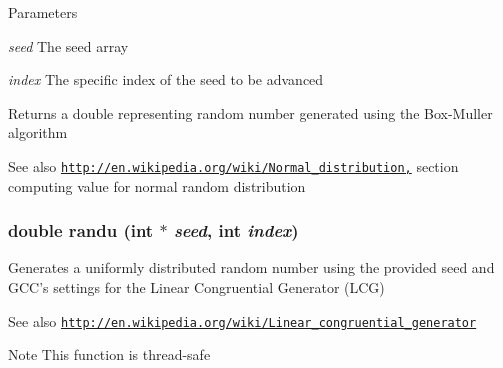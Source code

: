 \begin{DoxyParams}{Parameters}
\item[{\em seed}]The seed array \item[{\em index}]The specific index of the seed to be advanced \end{DoxyParams}
\begin{DoxyReturn}{Returns}
a double representing random number generated using the Box-\/Muller algorithm 
\end{DoxyReturn}
\begin{DoxySeeAlso}{See also}
\href{http://en.wikipedia.org/wiki/Normal_distribution,}{\tt http://en.wikipedia.org/wiki/Normal\_\-distribution,} section computing value for normal random distribution 
\end{DoxySeeAlso}
\hypertarget{ex__particle__CUDA__naive__full_8cu_ab1c72924f3fb8ede452cb4f287907741}{
\subsubsection[{randu}]{\setlength{\rightskip}{0pt plus 5cm}double randu (int $\ast$ {\em seed}, \/  int {\em index})}}
\label{ex__particle__CUDA__naive__full_8cu_ab1c72924f3fb8ede452cb4f287907741}
Generates a uniformly distributed random number using the provided seed and GCC's settings for the Linear Congruential Generator (LCG) \begin{DoxySeeAlso}{See also}
\href{http://en.wikipedia.org/wiki/Linear_congruential_generator}{\tt http://en.wikipedia.org/wiki/Linear\_\-congruential\_\-generator} 
\end{DoxySeeAlso}
\begin{DoxyNote}{Note}
This function is thread-\/safe 
\end{DoxyNote}

